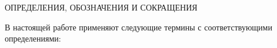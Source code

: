 \begin{center}
	ОПРЕДЕЛЕНИЯ, ОБОЗНАЧЕНИЯ И СОКРАЩЕНИЯ
\end{center}

В настоящей работе применяют следующие термины с соответствующими определениями: